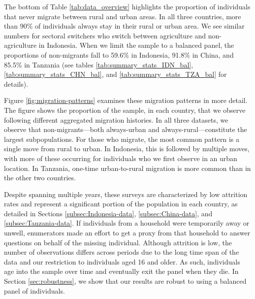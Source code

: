 The bottom of Table \ref{tab:data_overview} highlights the proportion of individuals that never migrate between rural and urban areas. In all three countries, more than 90\% of individuals always stay in their rural or urban area.
We see similar numbers for sectoral switchers who switch between agriculture and non-agriculture in Indonesia.
When we limit the sample to a balanced panel, the proportions of non-migrants fall to 59.6\% in Indonesia, 91.8\% in China, and 85.5\% in Tanzania (see tables \ref{tab:summary_stats_IDN_bal}, \ref{tab:summary_stats_CHN_bal}, and \ref{tab:summary_stats_TZA_bal} for details). 

Figure \ref{fig:migration-patterns} examines these migration patterns in more detail.
The figure shows the proportion of the sample, in each country, that we observe following different aggregated migration histories.
In all three datasets, we observe that non-migrants---both always-urban and always-rural---constitute the largest subpopulations.
For those who migrate, the most common pattern is a single move from rural to urban. 
In Indonesia, this is followed by multiple moves, with more of these occurring for individuals who we first observe in an urban location.
In Tanzania, one-time urban-to-rural migration is more common than in the other two countries.

Despite spanning multiple years, these surveys are characterized by low attrition rates and represent a significant portion of the population in each country, as detailed in Sections \ref{subsec:Indonesia-data}, \ref{subsec:China-data}, and \ref{subsec:Tanzania-data}. 
If individuals from a household were temporarily away or unwell, enumerators made an effort to get a proxy from that household to answer questions on behalf of the missing individual. Although attrition is low, the number of observations differs across periods due to the long time span of the data and our restriction to individuals aged 16 and older. As such, individuals age into the sample over time and eventually exit the panel when they die. In Section \ref{sec:robustness}, we show that our results are robust to using a balanced panel of individuals.


